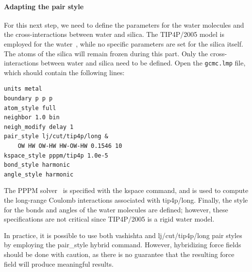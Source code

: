 \documentclass[9pt,tutorial]{livecoms}
\newcommand{\lmpcmd}[1]{\hspace{0pt}\colorbox{listing}{\textcolor{command}{\small{#1}}}\hspace{0pt}} %
\newcommand{\flecmd}[1]{\textcolor{command}{\texttt{#1}}} %
\begin{document}

{\color{blue}
\paragraph{Adapting the pair style}

For this next step, we need to define the parameters for the water molecules and
the cross-interactions between water and silica. The TIP4P/2005 model is employed
for the water~\cite{abascal2005general}, while no specific parameters are set
for the silica itself. The atoms of the silica will remain frozen during this part.
Only the cross-interactions between water and silica need
to be defined. Open the \flecmd{gcmc.lmp} file, which should contain the following lines:
\begin{lstlisting}
units metal
boundary p p p
atom_style full
neighbor 1.0 bin
neigh_modify delay 1
pair_style lj/cut/tip4p/long &
    OW HW OW-HW HW-OW-HW 0.1546 10
kspace_style pppm/tip4p 1.0e-5
bond_style harmonic
angle_style harmonic
\end{lstlisting}
The PPPM solver~\cite{luty1996calculating} is specified with the \lmpcmd{kspace}
command, and is used to compute the long-range Coulomb interactions associated
with \lmpcmd{tip4p/long}.  Finally, the style for the bonds
and angles of the water molecules are defined; however, these specifications are
not critical since TIP4P/2005 is a rigid water model.}

\begin{note}
{\color{blue}In practice, it is possible to use both \lmpcmd{vashishta} and
\lmpcmd{lj/cut/tip4p/long} pair styles by employing the \lmpcmd{pair\_style hybrid}
command.  However, hybridizing force fields should be done with caution, as there
is no guarantee that the resulting force field will produce meaningful results.}
\end{note}
\end{document}
